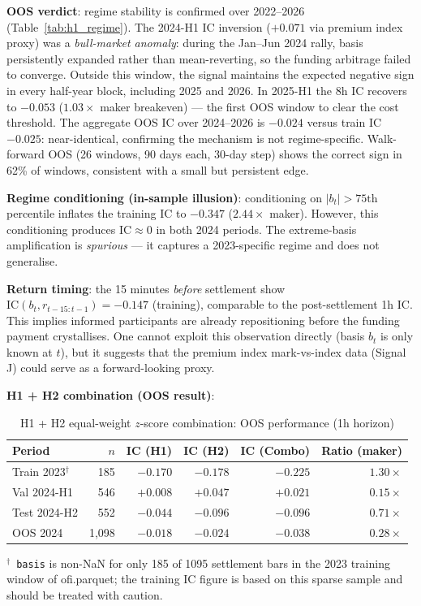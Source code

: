 \documentclass[12pt, a4paper]{article}
\theoremstyle{definition}
\begin{document}
\textbf{OOS verdict}: regime stability is confirmed over 2022--2026
(Table~\ref{tab:h1_regime}).  The 2024-H1 IC inversion ($+0.071$ via premium
index proxy) was a \emph{bull-market anomaly}: during the Jan--Jun 2024 rally,
basis persistently expanded rather than mean-reverting, so the funding
arbitrage failed to converge.  Outside this window, the signal maintains
the expected negative sign in every half-year block, including 2025 and 2026.
In 2025-H1 the 8h IC recovers to $-0.053$ ($\mathbf{1.03\times}$ maker
breakeven) --- the first OOS window to clear the cost threshold.  The
aggregate OOS IC over 2024--2026 is $-0.024$ versus train IC $-0.025$:
near-identical, confirming the mechanism is not regime-specific.
Walk-forward OOS (26 windows, 90 days each, 30-day step) shows the correct
sign in 62\% of windows, consistent with a small but persistent edge.

\textbf{Regime conditioning (in-sample illusion)}: conditioning on
$|b_t| > 75\text{th}$ percentile inflates the training IC to $-0.347$
($2.44\times$ maker).  However, this conditioning produces
$\mathrm{IC} \approx 0$ in both 2024 periods.  The extreme-basis
amplification is \emph{spurious} — it captures a 2023-specific regime
and does not generalise.

\textbf{Return timing}: the 15 minutes \emph{before} settlement show
$\mathrm{IC}(b_t, r_{t-15:t-1}) = -0.147$ (training), comparable to the
post-settlement 1h IC.  This implies informed participants are already
repositioning before the funding payment crystallises.  One cannot exploit
this observation directly (basis $b_t$ is only known at $t$), but it suggests
that the premium index mark-vs-index data (Signal J) could serve as a
forward-looking proxy.

\textbf{H1 + H2 combination (OOS result)}:

\begin{table}[H]
\centering
\small
\caption{H1 + H2 equal-weight $z$-score combination: OOS performance (1h horizon)}
\label{tab:h1h2_oos}
\begin{tabular}{lrrrrr}
\toprule
Period & $n$ & IC (H1) & IC (H2) & IC (Combo) & Ratio (maker) \\
\midrule
Train 2023$^\dagger$ &   185 & $-0.170$ & $-0.178$ & $-0.225$ & $1.30\times$ \\
Val   2024-H1        &   546 & $+0.008$ & $+0.047$ & $+0.021$ & $0.15\times$ \\
Test  2024-H2        &   552 & $-0.044$ & $-0.096$ & $-0.096$ & $0.71\times$ \\
\midrule
OOS   2024           & 1,098 & $-0.018$ & $-0.024$ & $-0.038$ & $\mathbf{0.28\times}$ \\
\bottomrule
\end{tabular}
\par\smallskip\raggedright\footnotesize
$^\dagger$~\texttt{basis} is non-NaN for only 185 of 1095 settlement bars in
the 2023 training window of ofi.parquet; the training IC figure is based on this
sparse sample and should be treated with caution.
\end{table}
\end{document}
